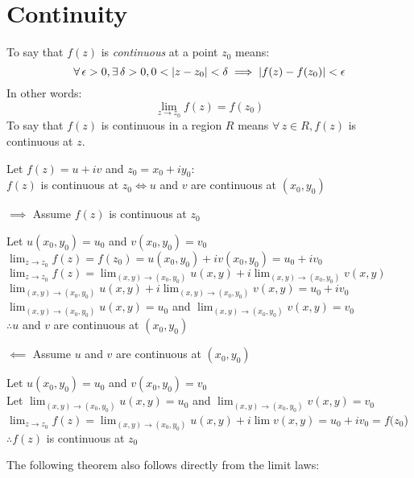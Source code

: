 \documentclass[letterpaper,12pt,fleqn]{article}
\renewcommand{\d}{\delta}
\newcommand{\e}{\epsilon}
\newcommand{\limz}{\lim_{z\to z_0}}
\newcommand{\limxy}{\lim_{(x,y)\to (x_0,y_0)}}
\begin{document}
\section*{Continuity}

\begin{definition}
  To say that $f(z)$ is \emph{continuous} at a point $z_0$ means:
  \[\forall\,\e>0,\exists\,\d>0,0<\abs{z-z_0}<\d\implies\abs{f(z)-f(z_0)}<\e\]
  In other words:
  \[\limz{f(z)}=f(z_0)\]
  To say that $f(z)$ is continuous in a region $R$ means
  $\forall\,z\in R,f(z)$ is continuous at $z$.
\end{definition}

\begin{theorem}
  Let $f(z)=u+iv$ and $z_0=x_0+iy_0$: \\
  $f(z)$ is continuous at $z_0\iff u$ and $v$ are continuous at $(x_0,y_0)$
\end{theorem}

\begin{theproof}
  \listbreak
  \begin{description}
  \item $\implies$ Assume $f(z)$ is continuous at $z_0$

    Let $u(x_0,y_0)=u_0$ and $v(x_0,y_0)=v_0$ \\
    $\limz f(z)=f(z_0)=u(x_0,y_0)+iv(x_0,y_0)=u_0+iv_0$ \\
    $\limz f(z)=\limxy u(x,y)+i\limxy v(x,y)$ \\
    $\limxy u(x,y)+i\limxy v(x,y)=u_0+iv_0$ \\
    $\limxy u(x,y)=u_0$ and $\limxy v(x,y)=v_0$ \\
    $\therefore u$ and $v$ are continuous at $(x_0,y_0)$

  \item $\impliedby$ Assume $u$ and $v$ are continuous at $(x_0,y_0)$

    Let $u(x_0,y_0)=u_0$ and $v(x_0,y_0)=v_0$ \\
    Let $\limxy u(x,y)=u_0$ and $\limxy v(x,y)=v_0$ \\
    $\limz f(z)=\limxy u(x,y)+i\lim v(x,y)=u_0+iv_0=f(z_0$) \\
    $\therefore f(z)$ is continuous at $z_0$
  \end{description}
\end{theproof}

The following theorem also follows directly from the limit laws:
\end{document}
